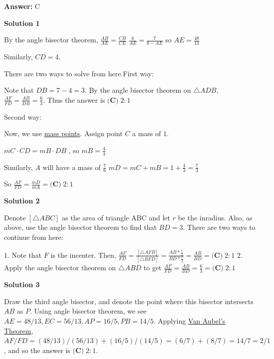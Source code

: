 \begin{enumerate}
 \textbf{Answer: }C



\textbf{Solution 1}

By the angle bisector theorem, $\frac{AB}{AE} = \frac{CB}{CE}$
$\frac{6}{AE} = \frac{7}{8 - AE}$ so $AE = \frac{48}{13}$

 Similarly, $CD = 4$.

 There are two ways to solve from here.First way: 

 Note that $DB = 7 - 4 = 3.$ By the angle bisector theorem on $\triangle ADB,$ $\frac{AF}{FD} = \frac{AB}{DB} = \frac{6}{3}.$ Thus the answer is $\boxed{\textbf{(C)}\; 2 : 1}$

 Second way:

 Now, we use \href{https://artofproblemsolving.com/wiki/index.php?title=Mass\_points}{mass points}. Assign point $C$ a mass of $1$.

 $mC \cdot CD = mB \cdot DB$ , so $mB = \frac{4}{3}$

 Similarly, $A$ will have a mass of $\frac{7}{6}$
$mD = mC + mB = 1 + \frac{4}{3} = \frac{7}{3}$

 So $\frac{AF}{FD} = \frac{mD}{mA} = \boxed{\textbf{(C)}\; 2 : 1}$




\textbf{Solution 2}

Denote $[\triangle{ABC}]$ as the area of triangle ABC and let $r$ be the inradius. Also, as above, use the angle bisector theorem to find that $BD = 3$. There are two ways to continue from here:

 $1.$ Note that $F$ is the incenter. Then, $\frac{AF}{FD} = \frac{[\triangle{AFB}]}{[\triangle{BFD}]} = \frac{AB * \frac{r}{2}}{BD * \frac{r}{2}} = \frac{AB}{BD} =  \boxed{\textbf{(C)}\; 2 : 1}$
$2.$ Apply the angle bisector theorem on $\triangle{ABD}$ to get $\frac{AF}{FD} = \frac{AB}{BD} = \frac{6}{3} = \boxed{\textbf{(C)}\; 2 : 1}$




\textbf{Solution 3}

Draw the third angle bisector, and denote the point where this bisector intersects $AB$ as $P$. Using angle bisector theorem, we see $AE=48/13 , EC=56/13, AP=16/5, PB=14/5$. Applying \href{https://artofproblemsolving.com/wiki/index.php/Van\_Aubel\%27s\_Theorem}{Van Aubel's Theorem}, $AF/FD=(48/13)/(56/13) + (16/5)/(14/5)=(6/7)+(8/7)=14/7=2/1$, and so the answer is $\boxed{\textbf{(C)}\; 2 : 1}$.

 




\end{enumerate}
